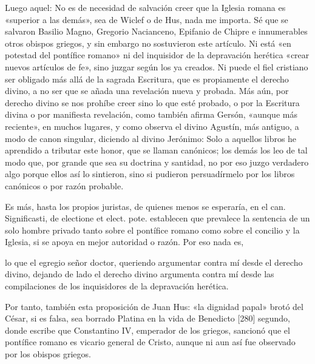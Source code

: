 Luego aquel: No es de necesidad de salvación creer que la Iglesia romana es «superior a las demás», sea de Wiclef o de Hus, nada me importa. Sé que se salvaron Basilio Magno, Gregorio Nacianceno, Epifanio de Chipre e innumerables otros obispos griegos, y sin embargo no sostuvieron este artículo. Ni está «en potestad del pontífice romano» ni del inquisidor de la depravación herética «crear nuevos artículos de fe», sino juzgar según los ya creados. Ni puede el fiel cristiano ser obligado más allá de la sagrada Escritura, que es propiamente el derecho divino, a no ser que se añada una revelación nueva y probada. Más aún, por derecho divino se nos prohíbe creer sino lo que esté probado, o por la Escritura divina o por manifiesta revelación, como también afirma Gersón, «aunque más reciente», en muchos lugares, y como observa el divino Agustín, más antiguo, a modo de canon singular, diciendo al divino Jerónimo: Solo a aquellos libros he aprendido a tributar este honor, que se llaman canónicos; los demás los leo de tal modo que, por grande que sea su doctrina y santidad, no por eso juzgo verdadero algo porque ellos así lo sintieron, sino si pudieron persuadírmelo por los libros canónicos o por razón probable.

Es más, hasta los propios juristas, de quienes menos se esperaría, en el can. Significasti, de electione et elect. pote. establecen que prevalece la sentencia de un solo hombre privado tanto sobre el pontífice romano como sobre el concilio y la Iglesia, si se apoya en mejor autoridad o razón. Por eso nada es,

lo que el egregio señor doctor, queriendo argumentar contra mí desde el derecho divino, dejando de lado el derecho divino argumenta contra mí desde las compilaciones de los inquisidores de la depravación herética.

Por tanto, también esta proposición de Juan Hus: «la dignidad papal» brotó del César, si es falsa, sea borrado Platina en la vida de Benedicto [280] segundo, donde escribe que Constantino IV, emperador de los griegos, sancionó que el pontífice romano es vicario general de Cristo, aunque ni aun así fue observado por los obispos griegos.

